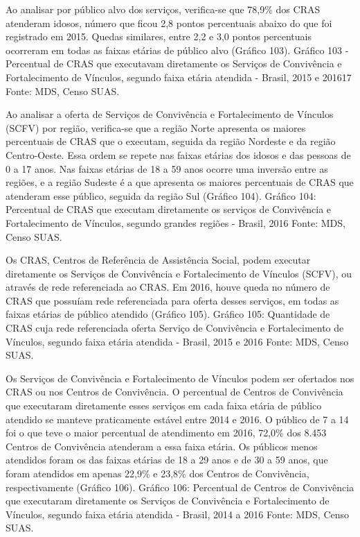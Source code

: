 \documentclass[
  brazilian]{report}
\begin{document}
Ao analisar por público alvo dos serviços, verifica-se que 78,9\% dos
CRAS atenderam idosos, número que ficou 2,8 pontos percentuais abaixo do
que foi registrado em 2015. Quedas similares, entre 2,2 e 3,0 pontos
percentuais ocorreram em todas as faixas etárias de público alvo
(Gráfico 103). Gráfico 103 - Percentual de CRAS que executavam
diretamente os Serviços de Convivência e Fortalecimento de Vínculos,
segundo faixa etária atendida - Brasil, 2015 e 201617 Fonte: MDS, Censo
SUAS.

Ao analisar a oferta de Serviços de Convivência e Fortalecimento de
Vínculos (SCFV) por região, verifica-se que a região Norte apresenta os
maiores percentuais de CRAS que o executam, seguida da região Nordeste e
da região Centro-Oeste. Essa ordem se repete nas faixas etárias dos
idosos e das pessoas de 0 a 17 anos. Nas faixas etárias de 18 a 59 anos
ocorre uma inversão entre as regiões, e a região Sudeste é a que
apresenta os maiores percentuais de CRAS que atenderam esse público,
seguida da região Sul (Gráfico 104). Gráfico 104: Percentual de CRAS que
executam diretamente os serviços de Convivência e Fortalecimento de
Vínculos, segundo grandes regiões - Brasil, 2016 Fonte: MDS, Censo SUAS.

Os CRAS, Centros de Referência de Assistência Social, podem executar
diretamente os Serviços de Convivência e Fortalecimento de Vínculos
(SCFV), ou através de rede referenciada ao CRAS. Em 2016, houve queda no
número de CRAS que possuíam rede referenciada para oferta desses
serviços, em todas as faixas etárias de público atendido (Gráfico 105).
Gráfico 105: Quantidade de CRAS cuja rede referenciada oferta Serviço de
Convivência e Fortalecimento de Vínculos, segundo faixa etária atendida
- Brasil, 2015 e 2016 Fonte: MDS, Censo SUAS.

Os Serviços de Convivência e Fortalecimento de Vínculos podem ser
ofertados nos CRAS ou nos Centros de Convivência. O percentual de
Centros de Convivência que executaram diretamente esses serviços em cada
faixa etária de público atendido se manteve praticamente estável entre
2014 e 2016. O público de 7 a 14 foi o que teve o maior percentual de
atendimento em 2016, 72,0\% dos 8.453 Centros de Convivência atenderam a
essa faixa etária. Os públicos menos atendidos foram os das faixas
etárias de 18 a 29 anos e de 30 a 59 anos, que foram atendidos em apenas
22,9\% e 23,8\% dos Centros de Convivência, respectivamente (Gráfico
106). Gráfico 106: Percentual de Centros de Convivência que executaram
diretamente os Serviços de Convivência e Fortalecimento de Vínculos,
segundo faixa etária atendida - Brasil, 2014 a 2016 Fonte: MDS, Censo
SUAS.
\end{document}
